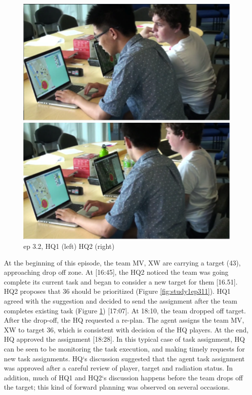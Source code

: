 \begin{figure}[ht]
\centering
\begin{minipage}[b]{0.45\linewidth}
\includegraphics[width=1\textwidth]{img/study3/ep11}
\caption{ep 3.1, HQ1 (left) HQ2 (right) }
\label{fig:study1ep311}
\end{minipage}
\quad
\begin{minipage}[b]{0.45\linewidth}
 \includegraphics[width=1\textwidth]{img/study3/ep12}
\caption{ep 3.2, HQ1 (left) HQ2 (right)}
\label{fig:study1ep312}
\end{minipage}
\end{figure}

At the beginning of this episode, the team MV, XW are carrying a target (43), approaching drop off zone. At [16:45], the HQ2 noticed the team was going complete its current task and began to consider a new target for them [16.51]. HQ2 proposes that 36 should be prioritized (Figure \ref{fig:study1ep311}). HQ1 agreed with the suggestion and decided to send the assignment after the team completes existing task (Figure \ref{fig:study1ep312}) [17:07]. At 18:10, the team dropped off target. After the drop-off, the HQ requested a re-plan. The agent assigns the team MV, XW to target 36, which is consistent with decision of the HQ players. At the end, HQ approved the assignment [18:28]. In this typical case of task assignment, HQ  can be seen to be monitoring the task execution, and making timely requests for new task assignments. HQ`s discussion suggested that the agent task assignment was approved after a careful review of player, target and radiation status. In addition, much of HQ1 and HQ2`s discussion happens before the team drops off the target; this kind of forward planning was observed on several occasions.\\

